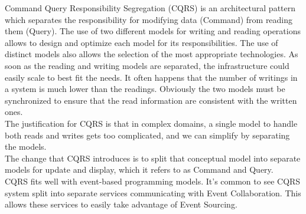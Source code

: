 \newpage
{}
Command Query Responsibility Segregation (CQRS) is an architectural pattern which separates the responsibility for modifying data (Command) from reading them (Query). The use of two different models for writing and reading operations allows to design and optimize each model for its responsibilities. The use of distinct models also allows the selection of the most appropriate technologies. As soon as the reading and writing models are separated, the infrastructure could easily scale to best fit the needs. It often happens that the number of writings in a system is much lower than the readings. Obviously the two models must be synchronized to ensure that the read information are consistent with the written ones.\\
The justification for CQRS is that in complex domains, a single model to handle both reads and writes gets too complicated, and we can simplify by separating the models.\\
The change that CQRS introduces is to split that conceptual model into separate models for update and display, which it refers to as Command and Query.\\
CQRS fits well with event-based programming models. It's common to see CQRS system split into separate services communicating with Event Collaboration. This allows these services to easily take advantage of Event Sourcing.


